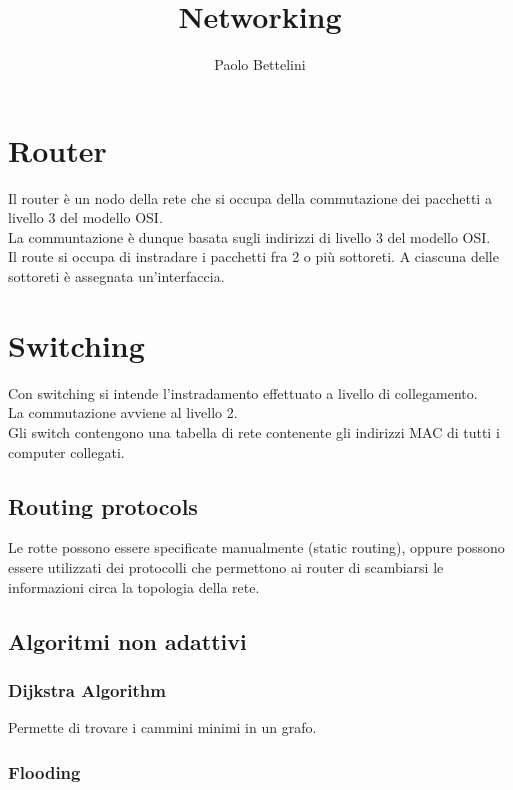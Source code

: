 \documentclass[a4paper]{article}
\title{Networking}
\author{Paolo Bettelini}
\date{}
\begin{document}
\maketitle
\tableofcontents
\pagebreak

\section{Router}

Il router è un nodo della rete che si occupa della commutazione dei pacchetti
a livello 3 del modello OSI.
\\
La communtazione è dunque basata sugli indirizzi
di livello 3 del modello OSI.
\\
Il route si occupa di instradare i pacchetti fra 2 o più sottoreti.
A ciascuna delle sottoreti è assegnata un'interfaccia.

\section{Switching}

Con switching si intende l'instradamento effettuato
a livello di collegamento.
\\
La commutazione
avviene al livello 2.
\\
Gli switch contengono una tabella di rete
contenente gli indirizzi MAC di tutti i computer
collegati.


\subsection{Routing protocols}
Le rotte possono essere specificate manualmente
(static routing), oppure possono essere utilizzati
dei protocolli che permettono ai router di scambiarsi
le informazioni circa la topologia della rete.

\subsection{Algoritmi non adattivi}

\subsubsection{Dijkstra Algorithm}

Permette di trovare i cammini minimi in un grafo.

\subsubsection{Flooding}
\end{document}
